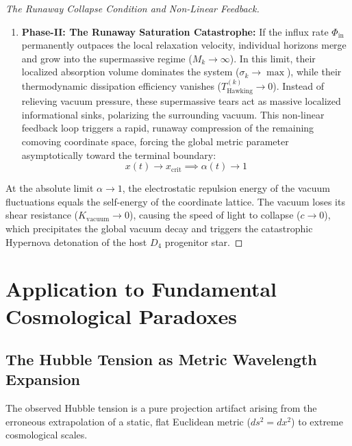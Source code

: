 \documentclass[11pt,a4paper]{article}
\theoremstyle{plain}
\theoremstyle{definition}
\theoremstyle{remark}
\begin{document}
\begin{proof}[The Runaway Collapse Condition and Non-Linear Feedback]
\begin{enumerate}
    \item \textbf{Phase-II: The Runaway Saturation Catastrophe:}
    If the influx rate $\Phi_{\text{in}}$ permanently outpaces the local relaxation velocity, individual horizons merge and grow into the supermassive regime ($M_k \to \infty$). In this limit, their localized absorption volume dominates the system ($\sigma_k \to \max$), while their thermodynamic dissipation efficiency vanishes ($T_{\text{Hawking}}^{(k)} \to 0$). 
    Instead of relieving vacuum pressure, these supermassive tears act as massive localized informational sinks, polarizing the surrounding vacuum. This non-linear feedback loop triggers a rapid, runaway compression of the remaining comoving coordinate space, forcing the global metric parameter asymptotically toward the terminal boundary:
    \begin{equation}
    x(t) \to x_{\text{crit}} \implies \alpha(t) \to 1
    \end{equation}
\end{enumerate}
At the absolute limit $\alpha \to 1$, the electrostatic repulsion energy of the vacuum fluctuations equals the self-energy of the coordinate lattice. The vacuum loses its shear resistance ($K_{\text{vacuum}} \to 0$), causing the speed of light to collapse ($c \to 0$), which precipitates the global vacuum decay and triggers the catastrophic Hypernova detonation of the host $D_4$ progenitor star.
\end{proof}

\newpage
\section{Application to Fundamental Cosmological Paradoxes}

\subsection{The Hubble Tension as Metric Wavelength Expansion}
The observed Hubble tension is a pure projection artifact arising from the erroneous extrapolation of a static, flat Euclidean metric ($ds^2 = dx^2$) to extreme cosmological scales.
\end{document}
